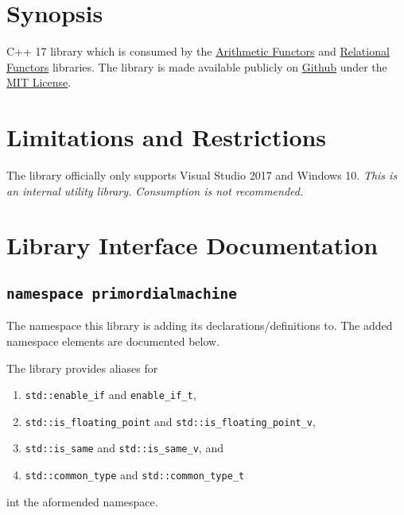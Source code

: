 \documentclass[oneside]{book}
\begin{document}
\frontmatter

\begin{titlepage}
\maketitle
\end{titlepage}

\tableofcontents
{}

\mainmatter

\chapter{Synopsis}
C++ 17 library which is consumed by the
\href{https://github.com/primordialmachine/arithmetic-functors}{Arithmetic Functors}
and
\href{https://github.com/primordialmachine/relational-functors}{Relational Functors}
libraries.
The library is made available publicly on
\href{\GetLibraryRepository}{Github}
under the
\href{\GetLibraryRepository/blob/master/LICENSE}{MIT License}.

\chapter{Limitations and Restrictions}
The library officially only supports Visual Studio 2017 and Windows 10.
\textit{\color{orange}This is an internal utility library.
                      Consumption is not recommended.}




\chapter{Library Interface Documentation}

\section{\texttt{namespace primordialmachine}}
The namespace this library is adding its declarations/definitions to.
The added namespace elements are documented below.\newline

The library provides aliases for
\begin{enumerate}
	\item \texttt{std::enable\_if} and \texttt{enable\_if\_t},
	\item \texttt{std::is\_floating\_point} and \texttt{std::is\_floating\_point\_v},
	\item \texttt{std::is\_same} and \texttt{std::is\_same\_v}, and
	\item \texttt{std::common\_type} and \texttt{std::common\_type\_t}
\end{enumerate}
int the aformended namespace.
\end{document}
